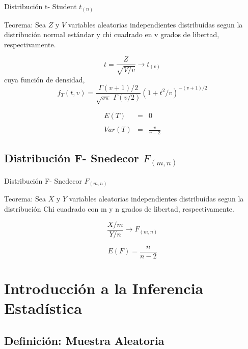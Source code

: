 \documentclass[
  ignorenonframetext,
]{beamer}
\begin{document}
\begin{frame}{Distribución t- Student \(t_{(n)}\)}

\justifying Teorema: Sea \(Z\) y \(V\) variables aleatorias
independientes distribuídas segun la distribución normal estándar y chi
cuadrado en v grados de libertad, respectivamente.

\[t=\frac{Z}{\sqrt{V/v}} \longrightarrow t_{(v)} \] cuya función de
densidad,
\[f_T(t,v)=\displaystyle \frac{\Gamma{(v+1)/2}}{\sqrt{v\pi} \,\,\Gamma(v/2)}(1+t^2/v)^{-(v+1)/2} \]

\[\begin{array}{rcl}
E(T) & = &0\\ 
 &   & \\ 
Var(T) &  = &\displaystyle \frac{v}{v-2} 
\end{array}\]

\end{frame}

\hypertarget{distribuciuxf3n-f--snedecor-f_mn}{%
\subsection{\texorpdfstring{Distribución F- Snedecor
\(F_{(m,n)}\)}{Distribución F- Snedecor F\_\{(m,n)\}}}\label{distribuciuxf3n-f--snedecor-f_mn}}

\begin{frame}{Distribución F- Snedecor \(F_{(m,n)}\)}

\justifying Teorema: Sea \(X\) y \(Y\) variables aleatorias
independientes distribuídas segun la distribución Chi cuadrado con m y n
grados de libertad, respectivamente.

\[\frac{X/m}{Y/n} \longrightarrow F_{(m,n)} \]

\[ E(F) =\displaystyle\frac{n}{n-2} \]

\end{frame}

\hypertarget{introducciuxf3n-a-la-inferencia-estaduxedstica}{%
\section{Introducción a la Inferencia
Estadística}\label{introducciuxf3n-a-la-inferencia-estaduxedstica}}

\hypertarget{definiciuxf3n-muestra-aleatoria}{%
\subsection{Definición: Muestra
Aleatoria}\label{definiciuxf3n-muestra-aleatoria}}
\end{document}
